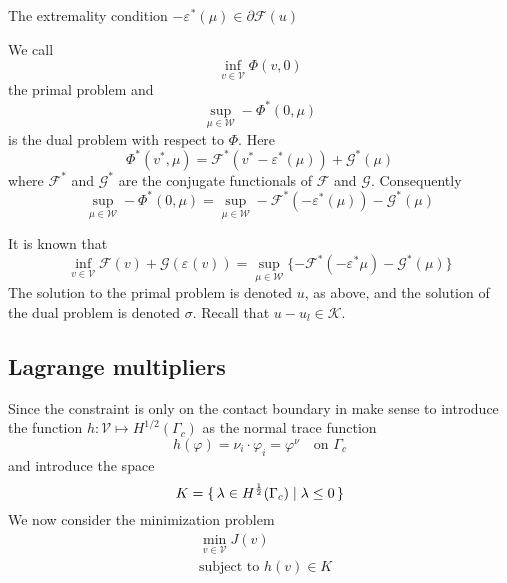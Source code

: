 \documentclass[12pt,a4paper]{article}
\numberwithin{equation}{section}
\numberwithin{table}{section}
\numberwithin{figure}{section}
\newcommand{\W}{\ensuremath{\mathcal{W}}}
\newcommand{\half}{\ensuremath{\frac{1}{2}}}
\newcommand{\V}{\ensuremath{\mathcal{V}}}
\newcommand{\K}{\ensuremath{\mathcal{K}}}
\newcommand{\F}{\ensuremath{{\mathcal F}}}
\newcommand{\G}{\ensuremath{{\mathcal G}}}
\renewcommand{\epsilon}{\varepsilon}
\renewcommand{\phi}{\varphi}
\newcommand{\strain}[1][]{\ensuremath{\epsilon_{#1}}}
\newcommand{\infvinV}{\ensuremath{\inf_{v\in \V}}}
\begin{document}
The extremality condition $-\strain^*(\mu) \in \partial \F(u)$

We call
\begin{equation}
  \infvinV \varPhi(v, 0)
\end{equation}
the primal problem and
\begin{equation}
  \sup_{\mu\in \W} -\varPhi^*(0,\mu)
\end{equation}
is the dual problem with respect to $\varPhi$.  Here
\begin{equation}
  \varPhi^*(v^*,\mu) = \F^*(v^*-\epsilon^*(\mu)) + \G^*(\mu)
\end{equation}
where $\F^*$ and $\G^*$ are the conjugate functionals of $\F$ and $\G$.  Consequently
\begin{equation}
  \sup_{\mu\in \W} -\varPhi^*(0,\mu)
  = \sup_{\mu\in \W} -\F^*(-\epsilon^*(\mu)) - \G^*(\mu)
\end{equation}

It is known that
\begin{equation}
  \label{eq:PrimalDualNoGap}
  \infvinV \F(v) + \G(\strain(v))
  = \sup_{\mu\in \W} \{ - \F^*(-\strain^* \mu) - \G^*(\mu) \}
\end{equation}
The solution to the primal problem is denoted $u$, as above, and the solution of the dual
problem is denoted $\sigma$.  Recall that $u-u_l\in \K$. 


\subsection{Lagrange multipliers}

Since the constraint is only on the contact boundary in make sense to introduce the function $h : \V \mapsto H^{1/2}(\Gamma_c)$ as the normal trace function
\begin{equation}
  h(\phi) = \nu_i\cdot\phi_i = \phi^\nu \quad \text{on $\Gamma_c$}
\end{equation}
and introduce the space
\begin{equation}
  K = \set{\lambda \in H^\half(\Gamma_c) | \lambda \le 0}
\end{equation}
We now consider the minimization problem 
\begin{equation}
  \begin{split}
    &\min_{v\in\V} J(v) \\
    &\text{subject to $h(v) \in K$}
  \end{split}
\end{equation}
\end{document}
